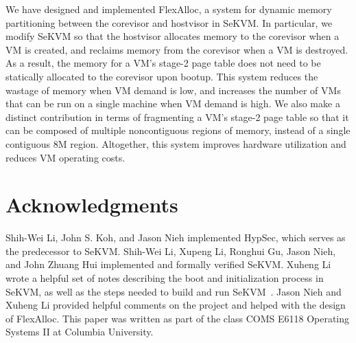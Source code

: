 We have designed and implemented FlexAlloc, a system for dynamic memory
partitioning between the corevisor and hostvisor in SeKVM. In particular, we
modify SeKVM so that the hostvisor allocates memory to the corevisor when a VM is
created, and reclaims memory from the corevisor when a VM is destroyed. As a
result, the memory for a VM's stage-2 page table does not need to be statically
allocated to the corevisor upon bootup. This system reduces the wastage of memory
when VM demand is low, and increases the number of VMs that can be run
on a single machine when VM demand is high. We also make a distinct contribution in terms of fragmenting
a VM's stage-2 page table so that it can be composed of multiple noncontiguous
regions of memory, instead of a single contiguous 8M region. Altogether, this
system improves hardware utilization and reduces VM operating costs.

\section*{Acknowledgments}

Shih-Wei Li, John S. Koh, and Jason Nieh implemented HypSec, which serves as
the predecessor to SeKVM. Shih-Wei Li, Xupeng Li, Ronghui Gu, Jason Nieh, and
John Zhuang Hui implemented and formally verified SeKVM. Xuheng Li wrote a
helpful set of notes describing the boot and initialization process in SeKVM,
as well as the steps needed to build and run SeKVM~\cite{xuheng}. Jason Nieh and
Xuheng Li provided helpful comments on the project and helped with the design
of FlexAlloc. This paper was written as part of the class COMS E6118 Operating
Systems II at Columbia University.








